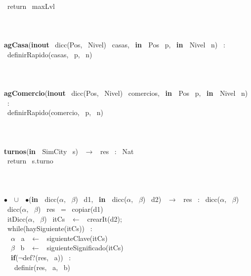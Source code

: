 \\\indent \ return \ maxLvl
\\\noindent\makebox[\linewidth]{\rule{\textwidth}{0.4pt}}
\\
\\\noindent\makebox[\linewidth]{\rule{\textwidth}{0.4pt}}
\\\textbf{agCasa}(\textbf{inout} \ dicc(Pos, \ Nivel) \ casas, \ \textbf{in \ }Pos \ p, \ \textbf{in \ }Nivel \ n) \ :
\\\indent \ definirRapido(casas, \ p, \ n) \ 
\\\noindent\makebox[\linewidth]{\rule{\textwidth}{0.4pt}}
\\
\\\noindent\makebox[\linewidth]{\rule{\textwidth}{0.4pt}}
\\\textbf{agComercio}(\textbf{inout} \ dicc(Pos, \ Nivel) \ comercios, \ \textbf{in \ }Pos \ p, \ \textbf{in \ }Nivel \ n) \ :
\\\indent \ definirRapido(comercio, \ p, \ n) \ 
\\\noindent\makebox[\linewidth]{\rule{\textwidth}{0.4pt}}
\\
\\\noindent\makebox[\linewidth]{\rule{\textwidth}{0.4pt}}
\\\textbf{turnos}(\textbf{in \ }SimCity \ s) \ $\rightarrow $ \ res \ : \ Nat
\\\indent \ return \ s.turno
\\\noindent\makebox[\linewidth]{\rule{\textwidth}{0.4pt}}
\\
\\\noindent\makebox[\linewidth]{\rule{\textwidth}{0.4pt}}
\\\textbf{$\bullet$ \ $\cup$ \ $\bullet$}(\textbf{in \ }dicc($\alpha$, \ $\beta$) \ d1, \ \textbf{in \ }dicc($\alpha$, \ $\beta$) \ d2) \ $\rightarrow $ \ res \ : \ dicc($\alpha$, \ $\beta$)
\\\indent \ dicc($\alpha$, \ $\beta$) \ res \ = \ copiar(d1)
\\\indent \ itDicc($\alpha$, \ $\beta$) \ itCs \ $\leftarrow$ \ crearIt(d2);
\\\indent \ while(haySiguiente(itCs)) \ :
\\\indent \ \indent \ $\alpha$ \ a \ $\leftarrow$ \ siguienteClave(itCs)
\\\indent \ \indent \ $\beta$ \ b \ $\leftarrow$ \ siguienteSignificado(itCs)
\\\indent \ \indent \ \textbf{if}($\neg$def?(res, \ a)) \ :
\\\indent \ \indent \ \indent \ definir(res, \ a, \ b)
